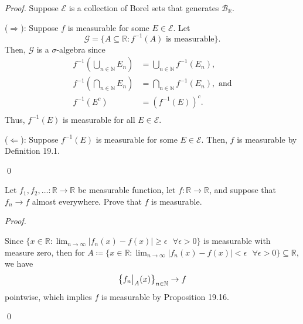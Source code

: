 \documentclass[12pt]{article}
\newenvironment{problem}[2][Problem]{\begin{trivlist}
\item[\hskip \labelsep {\bfseries #1}\hskip \labelsep {\bfseries
#2.}]}{\end{trivlist}}
\newenvironment{sol}
    {\emph{Proof.}
    }
    {
    \qed
    }
\newcommand\restr[2]{{%
  \left.\kern-\nulldelimiterspace %
  #1 %
  \vphantom{\big|} %
  \right|_{#2} %
  }}
\begin{document}
    \begin{sol} Suppose $\mathcal{E}$ is a collection of Borel sets that generates $\mathcal{B}_{\mathbb{R}}$.
    
      ($\Longrightarrow$): Suppose $f$ is measurable for some $E \in \mathcal{E}$. Let $$\mathcal{G} = \{A \subseteq \mathbb{R} : f^{-1}(A)\text{ is measurable}\}.$$
      Then, $\mathcal{G}$ is a $\sigma$-algebra since 
      \begin{align*}
        f^{-1}\left( \bigcup_{n \in \mathbb{N}}E_n  \right) &= \bigcup_{n \in \mathbb{N}}f^{-1}(E_n), \\
        f^{-1}\left( \bigcap_{n \in \mathbb{N}}E_n  \right) &= \bigcap_{n \in \mathbb{N}}f^{-1}(E_n), \text{ and}\\
        f^{-1}(E^c) &= \left(f^{-1}(E)\right)^c. \\
      \end{align*}
      Thus, $f^{-1}(E)$ is measurable for all $E \in \mathcal{E}$.
    
      ($\Longleftarrow$): Suppose $f^{-1}(E)$ is measurable for some $E \in \mathcal{E}$. Then, $f$ is measurable by Definition 19.1.
    \end{sol}
    
    \begin{problem}{44}
    Let $f_1,f_2,\dots : \mathbb{R} \to \mathbb{R}$ be measurable function, let $f : \mathbb{R} \to \mathbb{R}$, and suppose that $f_n \to f$ almost everywhere. Prove that $f$ is measurable.
    \end{problem}
    
    \begin{sol}
      Since $\{x \in \mathbb{R} : \lim_{n \to \infty} |f_n(x) - f(x)| \geq \epsilon \text{ } \forall \epsilon > 0\}$ is measurable with measure zero, then for $A \coloneqq \{x \in \mathbb{R} : \lim_{n \to \infty} |f_n(x) - f(x)| < \epsilon \text{ } \forall \epsilon > 0\} \subseteq \mathbb{R}$, we have 
      $$\left\{\restr{f_n}{A}(x)\right\}_{n \in \mathbb{N}} \to f$$ pointwise, which implies $f$ is measurable by Proposition 19.16.  
    \end{sol}
\end{document}
